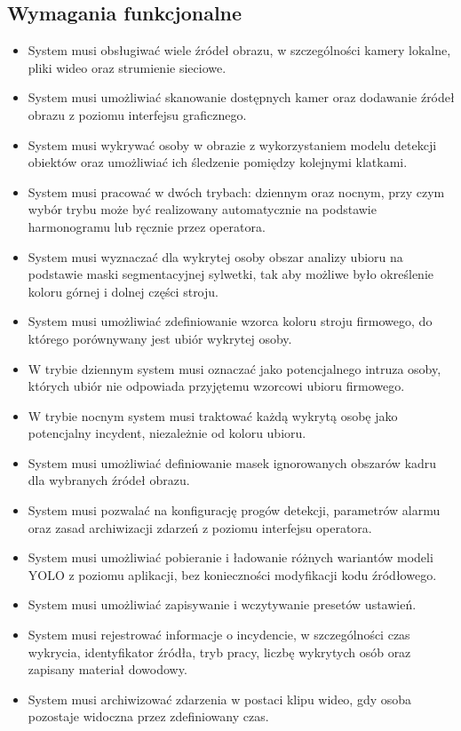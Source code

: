 \subsection{Wymagania funkcjonalne}
\begin{itemize}
\item System musi obsługiwać wiele źródeł obrazu, w szczególności kamery lokalne, pliki wideo oraz strumienie sieciowe.
\item System musi umożliwiać skanowanie dostępnych kamer oraz dodawanie źródeł obrazu z poziomu interfejsu graficznego.
\item System musi wykrywać osoby w obrazie z wykorzystaniem modelu detekcji obiektów oraz umożliwiać ich śledzenie pomiędzy kolejnymi klatkami.
\item System musi pracować w dwóch trybach: dziennym oraz nocnym, przy czym wybór trybu może być realizowany automatycznie na podstawie harmonogramu lub ręcznie przez operatora.
\item System musi wyznaczać dla wykrytej osoby obszar analizy ubioru na podstawie maski segmentacyjnej sylwetki, tak aby możliwe było określenie koloru górnej i dolnej części stroju.
\item System musi umożliwiać zdefiniowanie wzorca koloru stroju firmowego, do którego porównywany jest ubiór wykrytej osoby.
\item W trybie dziennym system musi oznaczać jako potencjalnego intruza osoby, których ubiór nie odpowiada przyjętemu wzorcowi ubioru firmowego.
\item W trybie nocnym system musi traktować każdą wykrytą osobę jako potencjalny incydent, niezależnie od koloru ubioru.
\item System musi umożliwiać definiowanie masek ignorowanych obszarów kadru dla wybranych źródeł obrazu.
\item System musi pozwalać na konfigurację progów detekcji, parametrów alarmu oraz zasad archiwizacji zdarzeń z poziomu interfejsu operatora.
\item System musi umożliwiać pobieranie i ładowanie różnych wariantów modeli YOLO z poziomu aplikacji, bez konieczności modyfikacji kodu źródłowego.
\item System musi umożliwiać zapisywanie i wczytywanie presetów ustawień.
\item System musi rejestrować informacje o incydencie, w szczególności czas wykrycia, identyfikator źródła, tryb pracy, liczbę wykrytych osób oraz zapisany materiał dowodowy.
\item System musi archiwizować zdarzenia w postaci klipu wideo, gdy osoba pozostaje widoczna przez zdefiniowany czas.

\end{itemize}
